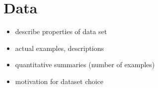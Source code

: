 \section{Data}

\begin{itemize}
  \item describe properties of data set
  \item actual examples, descriptions
  \item quantitative summaries (number of examples)
  \item motivation for dataset choice
\end{itemize}
